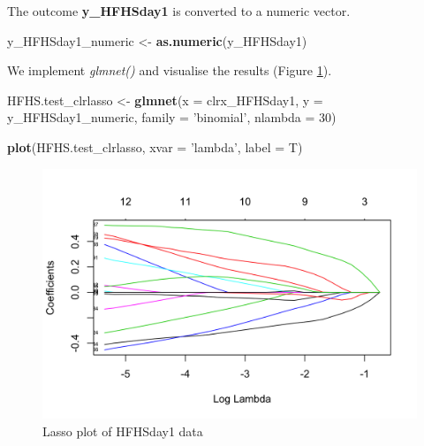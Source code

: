 \documentclass[openany]{book}
\newenvironment{Shaded}{\begin{snugshade}}{\end{snugshade}}
\newcommand{\KeywordTok}[1]{\textcolor[rgb]{0.13,0.29,0.53}{\textbf{#1}}}
\newcommand{\DataTypeTok}[1]{\textcolor[rgb]{0.13,0.29,0.53}{#1}}
\newcommand{\DecValTok}[1]{\textcolor[rgb]{0.00,0.00,0.81}{#1}}
\newcommand{\StringTok}[1]{\textcolor[rgb]{0.31,0.60,0.02}{#1}}
\newcommand{\NormalTok}[1]{#1}
\begin{document}
The outcome \textbf{y\_HFHSday1} is converted to a numeric vector.

\begin{Shaded}
\begin{Highlighting}[]
\NormalTok{y_HFHSday1_numeric <-}\StringTok{ }\KeywordTok{as.numeric}\NormalTok{(y_HFHSday1)}
\end{Highlighting}
\end{Shaded}

We implement \emph{glmnet()} and visualise the results (Figure
\ref{fig:HFHSlasso}).

\begin{Shaded}
\begin{Highlighting}[]
\NormalTok{HFHS.test_clrlasso <-}\StringTok{ }\KeywordTok{glmnet}\NormalTok{(}\DataTypeTok{x =}\NormalTok{ clrx_HFHSday1, }\DataTypeTok{y =}\NormalTok{ y_HFHSday1_numeric, }
                             \DataTypeTok{family =} \StringTok{'binomial'}\NormalTok{, }\DataTypeTok{nlambda =} \DecValTok{30}\NormalTok{)}
\end{Highlighting}
\end{Shaded}

\begin{Shaded}
\begin{Highlighting}[]
\KeywordTok{plot}\NormalTok{(HFHS.test_clrlasso, }\DataTypeTok{xvar =} \StringTok{'lambda'}\NormalTok{, }\DataTypeTok{label =}\NormalTok{ T)}
\end{Highlighting}
\end{Shaded}

\begin{figure}

{\centering \includegraphics[width=1\linewidth]{./Generated_plots/HFHSlasso-1} 

}

\caption{Lasso plot of HFHSday1 data}\label{fig:HFHSlasso}
\end{figure}
\end{document}
